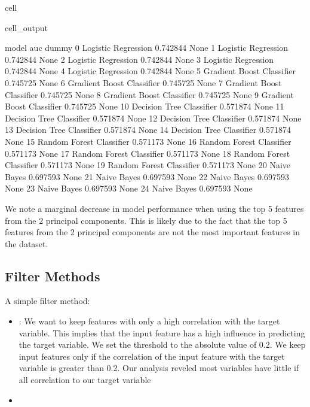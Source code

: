 \documentclass[letterpaper,10pt,english]{jupyterBook}
\begin{document}
\begin{sphinxuseclass}{cell}
\begin{sphinxVerbatimOutput}
\begin{sphinxuseclass}{cell_output}
\begin{sphinxVerbatim}[commandchars=\\\{\}]
                        model       auc dummy  
0        Logistic Regression   0.742844  None  
1        Logistic Regression   0.742844  None  
2        Logistic Regression   0.742844  None  
3        Logistic Regression   0.742844  None  
4        Logistic Regression   0.742844  None  
5   Gradient Boost Classifier  0.745725  None  
6   Gradient Boost Classifier  0.745725  None  
7   Gradient Boost Classifier  0.745725  None  
8   Gradient Boost Classifier  0.745725  None  
9   Gradient Boost Classifier  0.745725  None  
10   Decision Tree Classifier  0.571874  None  
11   Decision Tree Classifier  0.571874  None  
12   Decision Tree Classifier  0.571874  None  
13   Decision Tree Classifier  0.571874  None  
14   Decision Tree Classifier  0.571874  None  
15   Random Forest Classifier  0.571173  None  
16   Random Forest Classifier  0.571173  None  
17   Random Forest Classifier  0.571173  None  
18   Random Forest Classifier  0.571173  None  
19   Random Forest Classifier  0.571173  None  
20                Naive Bayes  0.697593  None  
21                Naive Bayes  0.697593  None  
22                Naive Bayes  0.697593  None  
23                Naive Bayes  0.697593  None  
24                Naive Bayes  0.697593  None  
\end{sphinxVerbatim}

\end{sphinxuseclass}\end{sphinxVerbatimOutput}

\end{sphinxuseclass}
\sphinxAtStartPar
We note a marginal decrease in model performance when using the top 5 features from the 2 principal components. This is likely due to the fact that the top 5 features from the 2 principal components are not the most important features in the dataset.


\subsection{Filter Methods}
\label{\detokenize{Model_evaluation:filter-methods}}
\sphinxAtStartPar
A simple filter method:
\begin{itemize}
\item {} 
\sphinxAtStartPar
{}: We want to keep features with only a high correlation with the target variable. This implies that the input feature has a high influence in predicting the target variable. We set the threshold to the absolute value of 0.2. We keep input features only if the correlation of the input feature with the target variable is greater than 0.2. Our analysis reveled most variables have little if all correlation to our target variable

\item {} 
\sphinxAtStartPar
{}

\end{itemize}
\end{document}
